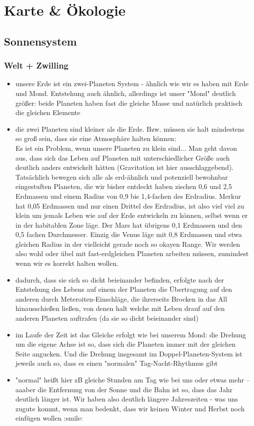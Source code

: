 \chapter{Karte \& Ökologie}
\section{Sonnensystem}
\subsection{Welt + Zwilling}
\begin{itemize}
	\item unsere Erde ist ein zwei-Planeten System - ähnlich wie wir es haben mit Erde und Mond. Entstehung auch ähnlich, allerdings ist unser "Mond" deutlich größer: beide Planeten haben fast die gleiche Masse und natürlich praktisch die gleichen Elemente
	\item die zwei Planeten sind kleiner als die Erde. Bzw. müssen sie halt mindestens so groß sein, dass sie eine Atmosphäre halten können: \\
	Es ist ein Problem, wenn unsere Planeten zu klein sind... Man geht davon aus, dass sich das Leben auf Planeten mit unterschiedlicher Größe auch deutlich anders entwickelt hätten (Gravitation ist hier ausschlaggebend). Tatsächlich bewegen sich alle als erd-ähnlich und potenziell bewohnbar eingestuften Planeten, die wir bisher entdeckt haben zischen 0,6 und 2,5 Erdmassen und einem Radius von 0,9 bis 1,4-fachen des Erdradius. Merkur hat 0,05 Erdmassen und nur einen Drittel des Erdradius, ist also viel viel zu klein um jemals Leben wie auf der Erde entwickeln zu können, selbst wenn er in der habitablen Zone läge. Der Mars hat übrigens 0,1 Erdmassen und den 0,5 fachen Durchmesser. Einzig die Venus läge mit 0,8 Erdmassen und etwa gleichen Radius in der vielleicht gerade noch so okayen Range. Wir werden also wohl oder übel mit fast-erdgleichen Planeten arbeiten müssen, zumindest wenn wir es korrekt halten wollen.
	\item dadurch, dass sie sich so dicht beieinander befinden, erfolgte nach der Entstehung des Lebens auf einem der Planeten die Übertragung auf den anderen durch Meteroiten-Einschläge, die ihrerseits Brocken in das All hinausschießen ließen, von denen halt welche mit Leben drauf auf den anderen Planeten auftrafen (da sie so dicht beieinander sind)
	\item im Laufe der Zeit ist das Gleiche erfolgt wie bei unserem Mond: die Drehung um die eigene Achse ist so, dass sich die Planeten immer mit der gleichen Seite angucken. Und die Drehung insgesamt im Doppel-Planeten-System ist jeweils auch so, dass es einen "normalen" Tag-Nacht-Rhythmus gibt
	\item "normal" heißt hier zB gleiche Stunden am Tag wie bei uns oder etwas mehr -- aaaber die Entfernung von der Sonne und die Bahn ist so, dass das Jahr deutlich länger ist. Wir haben also deutlich längere Jahreszeiten - was uns zugute kommt, wenn man bedenkt, dass wir keinen Winter und Herbst noch einfügen wollen :smile:
\end{itemize}

